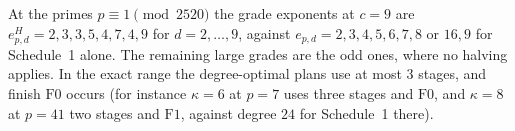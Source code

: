 At the primes $p \equiv 1 \pmod{2520}$ the grade exponents at $c = 9$ are $e^H_{p,d} = 2,3,3,5,4,7,4,9$ for $d = 2,\dots,9$, against $e_{p,d} = 2,3,4,5,6,7,8\text{ or }16,9$ for Schedule~1 alone. The remaining large grades are the odd ones, where no halving applies. In the exact range the degree-optimal plans use at most $3$ stages, and finish $\mathrm{F0}$ occurs (for instance $\kappa = 6$ at $p = 7$ uses three stages and $\mathrm{F0}$, and $\kappa = 8$ at $p = 41$ two stages and $\mathrm{F1}$, against degree $24$ for Schedule~1 there).
